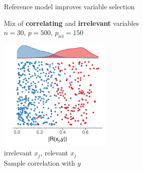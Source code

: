 \documentclass[english,t]{beamer}
\begin{document}
\begin{frame}{Reference model improves variable selection}

  Mix of \textbf{correlating} and \textbf{irrelevant} variables\\
  $n=30$, $p=500$, $p_\text{rel}=150$%

  \includegraphics[width=5.5cm]{toy_corr1.pdf}\\
  \vspace{-0.2cm}
  \hspace{0.5cm} {\color{set12} irrelevant $x_j$}, {\color{set11} relevant $x_j$}\\
  \vspace{0.2cm}
  \hspace{0.5cm} Sample correlation with $y$\\
  
\end{frame}
\end{document}
